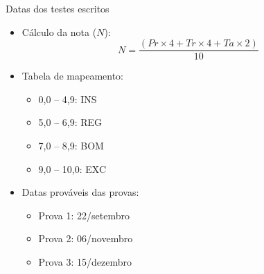       \begin{slide}[toc=]{Datas dos testes escritos}
         \begin{itemize}
       	    \item Cálculo da nota ($N$):
            \begin{equation*}
               N=\frac{( Pr \times 4 + Tr \times 4 + Ta \times 2 )} {10}
            \end{equation*}
          \item Tabela de mapeamento:
		  \begin{itemize}
			  \item 0,0 -- 4,9:  INS
			  \item 5,0 -- 6,9:  REG
			  \item 7,0 -- 8,9:  BOM
			  \item 9,0 -- 10,0:  EXC
		  \end{itemize}
            \item Datas prováveis das provas:
		    \begin{itemize}
			    \item Prova 1: 22/setembro
			    \item Prova 2: 06/novembro
			    \item Prova 3: 15/dezembro
		    \end{itemize}
         \end{itemize}
      \end{slide}


